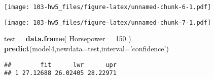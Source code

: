 \documentclass[]{article}
\newenvironment{Shaded}{\begin{snugshade}}{\end{snugshade}}
\newcommand{\DataTypeTok}[1]{\textcolor[rgb]{0.13,0.29,0.53}{#1}}
\newcommand{\DecValTok}[1]{\textcolor[rgb]{0.00,0.00,0.81}{#1}}
\newcommand{\KeywordTok}[1]{\textcolor[rgb]{0.13,0.29,0.53}{\textbf{#1}}}
\newcommand{\NormalTok}[1]{#1}
\newcommand{\OperatorTok}[1]{\textcolor[rgb]{0.81,0.36,0.00}{\textbf{#1}}}
\newcommand{\StringTok}[1]{\textcolor[rgb]{0.31,0.60,0.02}{#1}}
\begin{document}
\texttt{[image: 103-hw5\_files/figure-latex/unnamed-chunk-6-1.pdf]}

\begin{Shaded}
\end{Shaded}

\texttt{[image: 103-hw5\_files/figure-latex/unnamed-chunk-7-1.pdf]}

\begin{Shaded}
\begin{Highlighting}[]
\NormalTok{test =}\StringTok{ }\KeywordTok{data.frame}\NormalTok{(}
  \DataTypeTok{Horsepower =} \DecValTok{150}
\NormalTok{)}
\KeywordTok{predict}\NormalTok{(model4,}\DataTypeTok{newdata=}\NormalTok{test,}\DataTypeTok{interval=}\StringTok{'confidence'}\NormalTok{)}
\end{Highlighting}
\end{Shaded}

\begin{verbatim}
##        fit      lwr      upr
## 1 27.12688 26.02405 28.22971
\end{verbatim}
\end{document}

